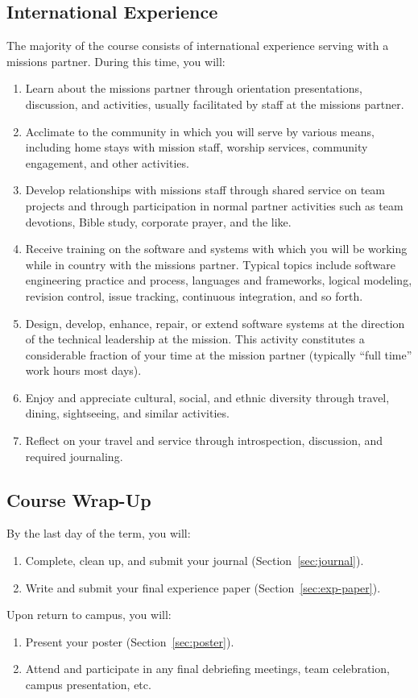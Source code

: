 \documentclass[11pt]{article}
\begin{document}
\subsection{International Experience}

The majority of the course
consists of international experience serving with a missions partner.
During this time, you will:
\begin{enumerate}
\item
  Learn about the missions partner
  through orientation presentations, discussion, and activities,
  usually facilitated by staff at the missions partner.
\item
  Acclimate to the community in which you will serve
  by various means, including home stays with mission staff,
  worship services, community engagement, and other activities.
\item
  Develop relationships with missions staff
  through shared service on team pro\-jects
  and through participation in normal partner activities
  such as team devotions, Bible study, corporate prayer, and the like.
\item
  Receive training on the software and systems
  with which you will be working while in country
  with the missions partner.
  Typical topics include software engineering practice and process,
  languages and frameworks, logical modeling, revision control,
  issue tracking, continuous integration, and so forth.
\item
  Design, develop, enhance, repair, or extend software systems
  at the direction of the technical leadership at the mission.
  This activity constitutes a considerable fraction
  of your time at the mission partner
  (typically ``full time'' work hours most days).
\item
  Enjoy and appreciate cultural, social, and ethnic diversity
  through travel, dining, sightseeing, and similar activities.
\item
  Reflect on your travel and service
  through introspection, discussion, and required journaling.
\end{enumerate}

\subsection{Course Wrap-Up}

By the last day of the term, you will:
\begin{enumerate}
\item Complete, clean up, and submit your journal (Section~\ref{sec:journal}).
\item Write and submit your final experience paper (Section~\ref{sec:exp-paper}).
\end{enumerate}
Upon return to campus, you will:
\begin{enumerate}
\item Present your poster (Section~\ref{sec:poster}).
\item Attend and participate in any final debriefing meetings,
  team celebration, campus presentation, etc.
\end{enumerate}
\end{document}
